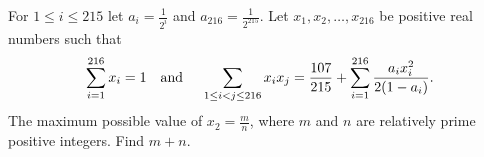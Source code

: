 For $1\leq i\leq 215$ let $a_i=\frac{1}{2^i}$ and $a_{216}=\frac{1}{2^{215}}$. Let $x_1,x_2,\ldots,x_{216}$ be positive real numbers such that \[ \sum\limits_{i=1}^{216} x_i=1 \text{\quad and \quad} \sum\limits_{1\leq i<j \leq 216} x_ix_j = \frac{107}{215}+ \sum\limits_{i=1}^{216} \frac{a_ix_i^2}{2(1-a_i)}.\]The maximum possible value of $x_2=\frac{m}{n}$,  where $m$ and $n$ are relatively prime positive integers. Find $m+n$.
